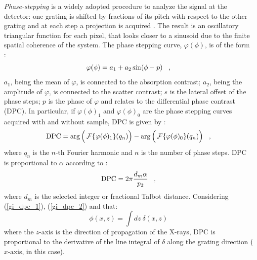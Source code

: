 {\newline
\emph{Phase-stepping} is a widely adopted procedure to analyze the signal at the detector:
one grating is shifted by fractions of its pitch with respect to the other grating and at each step a projection is acquired \cite{Modregger2012}.
The result is an oscillatory triangular function for each pixel, that looks closer to a sinusoid due to the finite spatial coherence of the system.
The phase stepping curve, $\varphi(\phi)$, is of the form \cite{Momose2006}:
\begin{equation}
    \varphi(\phi) = a_{1} + a_{2}\sin(\phi-p) \hspace{0.3cm},
\end{equation}
$a_{1}$, being the mean of $\varphi$, is connected to the absorption contrast;
$a_{2}$, being the amplitude of $\varphi$, is connected to the scatter contrast; 
$s$ is the lateral offset of the phase steps; $p$ is the phase of $\varphi$ and relates to the 
differential phase contrast (DPC). In particular, if $\varphi(\phi)_{1}$ and $\varphi(\phi)_{0}$ are
the phase stepping curves acquired with and without sample, DPC is given by \cite{Modregger2012}:
\begin{equation}
  \text{DPC} = \arg\Big(\operatorname{\mathcal{F}}\{\varphi(\phi)_{1}\}(q_{n})\Big) - \arg\Big(\operatorname{\mathcal{F}}\{\varphi(\phi)_{0}\}(q_{n})\Big) \hspace{0.3cm},
\end{equation}
where $q_{n}$ is the $n$-th Fourier harmonic and $n$ is the number of phase steps.
DPC is proportional to $\alpha$ according to \cite{Modregger2012}:
\begin{equation}
  \text{DPC} = 2\pi\frac{d_{m}\alpha}{p_{2}} \hspace{0.3cm},
   \label{gi_dpc_2} 
\end{equation}
where $d_{m}$ is the selected integer or fractional Talbot distance. 
Considering (\ref{gi_dpc_1}), (\ref{gi_dpc_2}) and that:
\begin{equation}
  \phi(x,z) = \int dz\: \delta(x,z)
\end{equation}
where the $z$-axis is the direction of propagation of the X-rays, DPC
is proportional to the derivative of the line integral of $\delta$ along the grating direction ($x$-axis, in this case).

}

